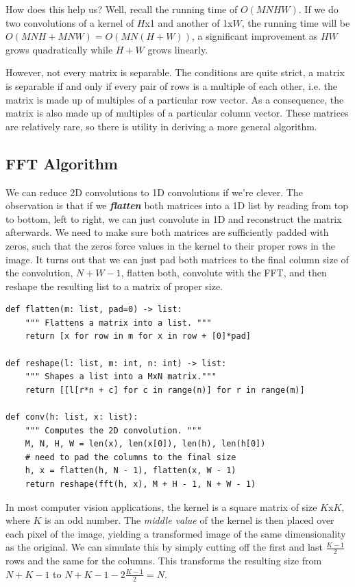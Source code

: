 \documentclass[11pt, oneside]{article}
\newcommand{\emphasis}[1]{\textbf{\textit{#1}}}
\theoremstyle{plain}
\theoremstyle{definition}
\begin{document}
How does this help us? Well, recall the running time of \( O(MNHW) \).
If we do two convolutions of a kernel of \( H \)x1  and another of 1x\( W \),
the running time will be \( O(MNH + MNW) = O(MN(H + W)) \), a significant
improvement as \( HW \) grows quadratically while \( H + W \) grows linearly.

However, not every matrix is separable. The conditions are quite strict,
a matrix is separable if and only if every pair of rows is a multiple of each
other, i.e. the matrix is made up of multiples of a particular row vector.
As a consequence, the matrix is also made up of multiples of a particular
column vector. These matrices are relatively rare, so there is utility
in deriving a more general algorithm.

\subsection{FFT Algorithm}

We can reduce 2D convolutions to 1D convolutions if we're clever.
The observation is that if we \emphasis{flatten} both matrices into a 1D list
by reading from top to bottom, left to right, we can just convolute in 1D
and reconstruct the matrix afterwards. We need to make sure both matrices
are sufficiently padded with zeros, such that the zeros force values
in the kernel to their proper rows in the image. It turns out that we can
just pad both matrices to the final column size of the convolution, 
\( N + W - 1 \), flatten both, convolute with the FFT, and then reshape the
resulting list to a matrix of proper size.
\begin{verbatim}
def flatten(m: list, pad=0) -> list:
    """ Flattens a matrix into a list. """
    return [x for row in m for x in row + [0]*pad]

def reshape(l: list, m: int, n: int) -> list:
    """ Shapes a list into a MxN matrix."""
    return [[l[r*n + c] for c in range(n)] for r in range(m)]

def conv(h: list, x: list):
    """ Computes the 2D convolution. """
    M, N, H, W = len(x), len(x[0]), len(h), len(h[0])
    # need to pad the columns to the final size
    h, x = flatten(h, N - 1), flatten(x, W - 1)
    return reshape(fft(h, x), M + H - 1, N + W - 1)
\end{verbatim}
In most computer vision applications, the kernel is a square matrix
of size \( K \)x\( K \), where \( K \) is an odd number.
The \textit{middle value} of the kernel is then placed over each pixel of the
image, yielding a transformed image of the same dimensionality as the original.
We can simulate this by simply cutting off the first and last
\( \frac{K - 1}{2} \) rows and the same for the columns.
This transforms the resulting size from \( N + K - 1 \) to
\( N + K - 1 - 2 \frac{K - 1}{2} = N \).
\end{document}
